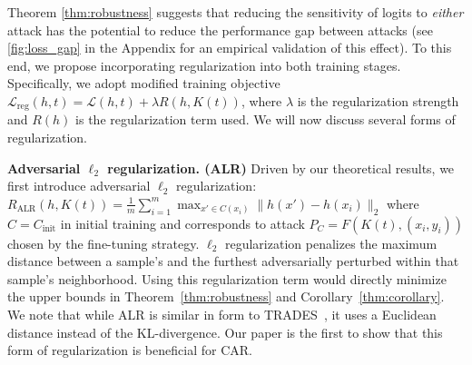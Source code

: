 \label{sec:regularization}
Theorem \ref{thm:robustness} suggests that reducing the sensitivity of logits to \textit{either} attack has the potential to reduce the performance gap between attacks (see \cref{fig:loss_gap} in the Appendix for an empirical validation of this effect). To this end, we propose incorporating regularization into both training stages.  Specifically, we adopt modified training objective $\mathcal{L}_{\text{reg}}(h,t) = \mathcal{L}(h,t) + \lambda R(h, K(t))$, 
where $\lambda$ is the regularization strength and $R(h)$ is the regularization term used. We will now discuss several forms of regularization.




\noindent
\textbf{Adversarial $\ell_2$ regularization. (ALR)}
Driven by our theoretical results, we first introduce adversarial $\ell_2$ regularization: $R_{\text{ALR}}(h, K(t)) =  \frac{1}{m} \sum_{i=1}^m \max_{x' \in C(x_i)} \|h(x') - h(x_i)\|_2$ where $C = C_{\text{init}}$ in initial training and corresponds to attack $P_C = F(K(t), (x_i, y_i))$ chosen by the fine-tuning strategy.  $\ell_2$ regularization penalizes the maximum distance between a sample's  and the furthest adversarially perturbed  within that sample's neighborhood. Using this regularization term would directly minimize the upper bounds in Theorem~\ref{thm:robustness} and Corollary~\ref{thm:corollary}.
We note that while ALR is similar in form to  TRADES~\cite{zhang2019theoretically}, it uses a Euclidean distance instead of the KL-divergence. Our paper is the first to show that this form of regularization is beneficial for CAR.

